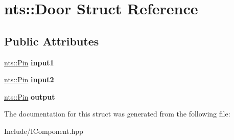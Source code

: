 \hypertarget{structnts_1_1Door}{}\section{nts\+:\+:Door Struct Reference}
\label{structnts_1_1Door}
\subsection*{Public Attributes}
\begin{DoxyCompactItemize}
\item 
\mbox{\label{structnts_1_1Door_a4d8b9c5416e7570afa88c65c5e6eeae3}} 
\mbox{\hyperlink{structnts_1_1Pin}{nts\+::\+Pin}} {\bfseries input1}
\item 
\mbox{\label{structnts_1_1Door_ac9f4f9247236b7df0ffb0a4f9925f563}} 
\mbox{\hyperlink{structnts_1_1Pin}{nts\+::\+Pin}} {\bfseries input2}
\item 
\mbox{\label{structnts_1_1Door_a66d30c7a27c9f160d8ffd71cb7f5933f}} 
\mbox{\hyperlink{structnts_1_1Pin}{nts\+::\+Pin}} {\bfseries output}
\end{DoxyCompactItemize}


The documentation for this struct was generated from the following file\+:\begin{DoxyCompactItemize}
\item 
Include/I\+Component.\+hpp\end{DoxyCompactItemize}
